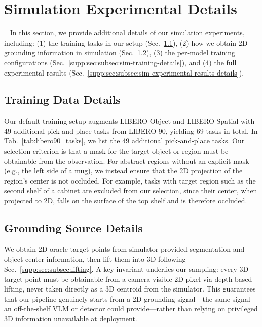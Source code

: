 \section{Simulation Experimental Details}~\label{supp:sec:simulation_setup_details}
In this section, we provide additional details of our simulation experiments, including: (1) the training tasks in our setup (Sec.~\ref{supp:sec:subsec:training_tasks}), (2) how we obtain 2D grounding information in simulation (Sec.~\ref{supp:sec:subsec:grounding-source}), (3) the per-model training configurations (Sec.~\ref{supp:sec:subsec:sim-training-details}), and (4) the full experimental results (Sec.~\ref{supp:sec:subsec:sim-experimental-results-details}).

\subsection{Training Data Details}
\label{supp:sec:subsec:training_tasks}
Our default training setup augments LIBERO-Object and LIBERO-Spatial with 49 additional pick-and-place tasks from LIBERO-90, yielding 69 tasks in total. 
In Tab.~\ref{tab:libero90_tasks}, we list the 49 additional pick-and-place tasks.
Our selection criterion is that a mask for the target object or region must be obtainable from the observation. For abstract regions without an explicit mask (e.g., the left side of a mug), we instead ensure that the 2D projection of the region's center is not occluded. For example, tasks with target region such as the second shelf of a cabinet are excluded from our selection, since their center, when projected to 2D, falls on the surface of the top shelf and is therefore occluded.


\subsection{Grounding Source Details}
\label{supp:sec:subsec:grounding-source}

We obtain 2D oracle target points from simulator-provided segmentation and object-center information, then lift them into 3D following Sec.~\ref{supp:sec:subsec:lifting}. A key invariant underlies our sampling: every 3D target point must be obtainable from a camera-visible 2D pixel via depth-based lifting, never taken directly as a 3D centroid from the simulator. This guarantees that our pipeline genuinely starts from a 2D grounding signal—the same signal an off-the-shelf VLM or detector could provide—rather than relying on privileged 3D information unavailable at deployment.

